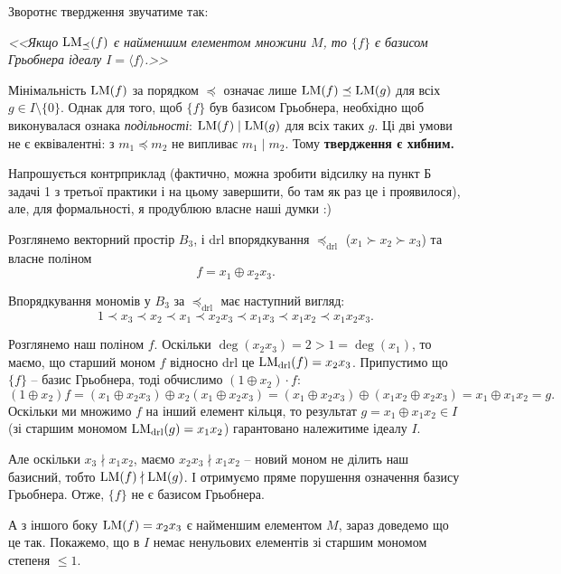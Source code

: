 \noindent Зворотнє твердження звучатиме так:

\textit{<<Якщо $\mathrm{LM}_{\preceq}(f)$ є найменшим елементом множини $M$, то $\{f\}$ є базисом Грьобнера ідеалу $I = \langle f \rangle$.>>}

Мінімальність $\mathrm{LM}(f)$ за порядком $\preceq$ означає лише $\mathrm{LM}(f) \preceq \mathrm{LM}(g)$ для всіх $g \in I \setminus \{0\}$. Однак 
для того, щоб $\{f\}$ був базисом Грьобнера, необхідно щоб виконувалася ознака \emph{подільності}: $\mathrm{LM}(f) \mid \mathrm{LM}(g)$ 
для всіх таких $g$. Ці дві умови не є еквівалентні: з $m_1 \preceq m_2$ не випливає $m_1 \mid m_2$. Тому \textbf{твердження є хибним.}

Напрошується контрприклад (фактично, можна зробити відсилку на пункт Б задачі 1 з третьої практики і на цьому 
завершити, бо там як раз це і проявилося), але, для формальності, я продублюю власне наші думки :)

Розглянемо векторний простір $B_3$, і drl впорядкування $\preceq_{\mathrm{drl}}$ ($x_1 \succ x_2 \succ x_3$) та 
власне поліном
\begin{equation*}
    f = x_1 \oplus x_2 x_3.
\end{equation*}

\noindent Впорядкування мономів у $B_3$ за $\preceq_{\mathrm{drl}}$ має наступний вигляд:
\begin{equation*}
    1 \prec x_3 \prec x_2 \prec x_1 \prec x_2 x_3 \prec x_1 x_3 \prec x_1 x_2 \prec x_1 x_2 x_3.
\end{equation*}

Розглянемо наш поліном $f$. Оскільки $\deg(x_2 x_3) = 2 > 1 = \deg(x_1)$, то маємо, що старший моном $f$ відносно 
drl це $\mathrm{LM}_{\mathrm{drl}}(f) = x_2 x_3$. Припустимо що $\{f\}$ -- базис Грьобнера, тоді обчислимо $(1 \oplus x_2) \cdot f$:
\begin{equation*}
    (1 \oplus x_2) f = (x_1 \oplus x_2 x_3) \oplus x_2(x_1 \oplus x_2 x_3)
    = (x_1 \oplus x_2 x_3) \oplus (x_1 x_2 \oplus x_2 x_3)
    = x_1 \oplus x_1 x_2 = g.
\end{equation*}
Оскільки ми множимо $f$ на інший елемент кільця, то результат $g = x_1 \oplus x_1 x_2 \in I$ (зі старшим мономом $\mathrm{LM}_{\mathrm{drl}}(g) = x_1 x_2$) 
гарантовано належитиме ідеалу $I$.

Але оскільки $x_3 \nmid x_1 x_2$, маємо $x_2 x_3 \nmid x_1 x_2$ -- новий моном не ділить наш базисний, тобто $\mathrm{LM}(f) \nmid \mathrm{LM}(g)$. 
І отримуємо пряме порушення означення базису Грьобнера. Отже, $\{f\}$ не є базисом Грьобнера.

А з іншого боку $\mathrm{LM}(f) = x_2 x_3$ є найменшим елементом $M$, зараз доведемо що це так. Покажемо, що в $I$ немає 
ненульових елементів зі старшим мономом степеня $\leq 1$.

